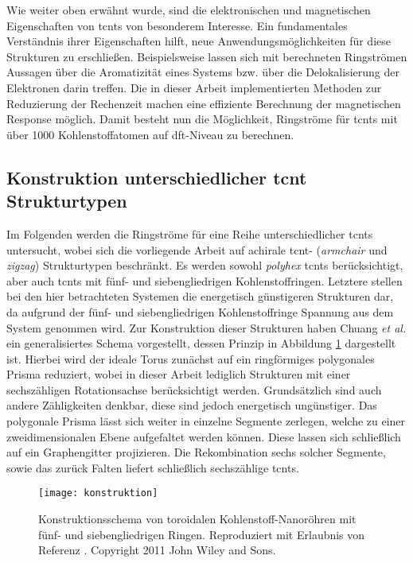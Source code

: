 Wie weiter oben erwähnt wurde, sind die elektronischen und magnetischen Eigenschaften von \acp{tcnt} von besonderem Interesse. Ein fundamentales Verständnis ihrer Eigenschaften hilft, neue Anwendungsmöglichkeiten für diese Strukturen zu erschließen. Beispielsweise lassen sich mit berechneten Ringströmen Aussagen über die Aromatizität eines Systems bzw. über die Delokalisierung der Elektronen darin treffen. Die in dieser Arbeit implementierten Methoden zur Reduzierung der Rechenzeit machen eine effiziente Berechnung der magnetischen Response möglich. Damit besteht nun die Möglichkeit, Ringströme für \acp{tcnt} mit über 1000 Kohlenstoffatomen auf \ac{dft}-Niveau zu berechnen.

\subsection{Konstruktion unterschiedlicher \acs{tcnt} Strukturtypen}
Im Folgenden werden die Ringströme für eine Reihe unterschiedlicher \acp{tcnt} untersucht, wobei sich die vorliegende Arbeit auf achirale \ac{tcnt}- (\textit{armchair} und \textit{zigzag}) Strukturtypen beschränkt. Es werden sowohl \textit{polyhex} \acp{tcnt} berücksichtigt, aber auch \acp{tcnt} mit fünf- und siebengliedrigen Kohlenstoffringen. Letztere stellen bei den hier betrachteten Systemen die energetisch günstigeren Strukturen dar, da aufgrund der fünf- und siebengliedrigen Kohlenstoffringe Spannung aus dem System genommen wird. Zur Konstruktion dieser Strukturen haben Chuang \textit{et al.}\supercite{chuang2009generalized,chuang2009dual,beuerle2011optical} ein generalisiertes Schema vorgestellt, dessen Prinzip in Abbildung \ref{abb:tcntkonstruktion} dargestellt ist. Hierbei wird der ideale Torus zunächst auf ein ringförmiges polygonales Prisma reduziert, wobei in dieser Arbeit lediglich Strukturen mit einer sechszähligen Rotationsachse berücksichtigt werden. Grundsätzlich sind auch andere Zähligkeiten denkbar, diese sind jedoch energetisch ungünstiger. Das polygonale Prisma lässt sich weiter in einzelne Segmente zerlegen, welche zu einer zweidimensionalen Ebene aufgefaltet werden können. Diese lassen sich schließlich auf ein Graphengitter projizieren. Die Rekombination sechs solcher Segmente, sowie das zurück Falten liefert schließlich sechszählige \acp{tcnt}. 
\FloatBarrier
\begin{figure}[ht!]
	\centering
	\texttt{[image: konstruktion]}
	\captionsetup{figurewithin = chapter}
	\captionsetup{font=small, labelfont=bf}\caption[Konstruktionsschema von toroidalen Kohlenstoff-Nanoröhren mit fünf- und siebengliedrigen Ringen]{Konstruktionsschema von toroidalen Kohlenstoff-Nanoröhren mit fünf- und siebengliedrigen Ringen. Reproduziert mit Erlaubnis von Referenz \cite{beuerle2011optical}. Copyright 2011 John Wiley and Sons.}
\label{abb:tcntkonstruktion}
\end{figure}

